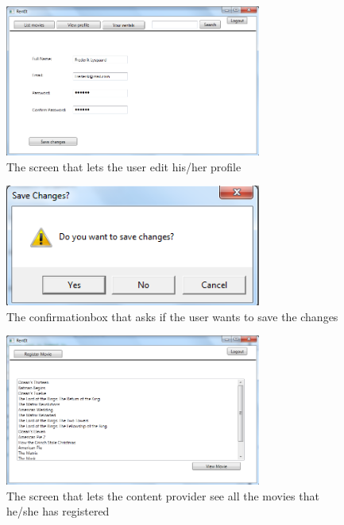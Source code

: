\begin{figure}[h!]
  \centering
    \includegraphics[width=0.75\textwidth]{Parts/Appendix/Images/Editprofile}
  \caption{The screen that lets the user edit his/her profile}
  \label{fig:Appendix_GUI_PrototypeEditprofile}
\end{figure}

\begin{figure}[h!]
  \centering
    \includegraphics[width=0.75\textwidth]{Parts/Appendix/Images/Confirmationbox}
  \caption{The confirmationbox that asks if the user wants to save the changes}
  \label{fig:Appendix_GUI_PrototypeEditprofile}
\end{figure}

\begin{figure}[h!]
  \centering
    \includegraphics[width=0.75\textwidth]{Parts/Appendix/Images/CPmovielist}
  \caption{The screen that lets the content provider see all the movies that he/she has registered}
  \label{fig:Appendix_GUI_PrototypeCPMovielist}
\end{figure}

